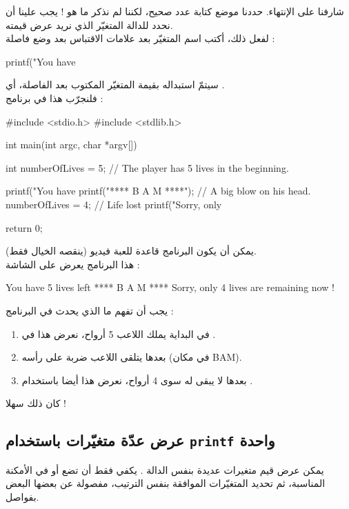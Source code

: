 شارفنا على الإنتهاء. حددنا موضع كتابة عدد صحيح، لكننا لم نذكر ما هو ! يجب علينا أن نحدد للدالة
المتغيّر الذي نريد عرض قيمته.\\
لفعل ذلك، أكتب اسم المتغيّر بعد علامات الاقتباس بعد وضع فاصلة :
\begin{Csource}
printf("You have %
\end{Csource}
 سيتمّ استبداله بقيمة المتغيّر المكتوب بعد الفاصلة، أي
.\\
فلنجرّب هذا في برنامج :
\begin{Csource}
#include <stdio.h>
#include <stdlib.h>

int main(int argc, char *argv[])
{
  int numberOfLives = 5; // The player has 5 lives in the beginning.

  printf("You have %
  printf("**** B A M ****\n"); // A big blow on his head.
  numberOfLives = 4; // Life lost
  printf("Sorry, only %

  return 0;
}
\end{Csource}
يمكن أن يكون البرنامج قاعدة للعبة فيديو (ينقصه الخيال فقط).\\
هذا البرنامج يعرض على الشاشة :
\begin{Console}
You have 5 lives left
**** B A M ****
Sorry, only 4 lives are remaining now !

\end{Console}
يجب أن تفهم ما الذي يحدث في البرنامج :
\begin{enumerate}
  \item في البداية يملك اللاعب 5 أرواح، نعرض هذا في
.
  \item  بعدها يتلقى اللاعب ضربة على رأسه (في مكان
\textenglish{BAM}).
  \item بعدها لا يبقى له سوى 4 أرواح، نعرض هذا أيضا باستخدام
.
\end{enumerate}
كان ذلك سهلا !

\subsection{عرض عدّة متغيّرات باستخدام
\texttt{printf}
واحدة
}
يمكن عرض قيم متغيرات عديدة بنفس الدالة
.
يكفي فقط أن تضع
أو
 في الأمكنة المناسبة، ثم تحديد المتغيّرات الموافقة بنفس الترتيب، مفصولة عن بعضها البعض بفواصل.

